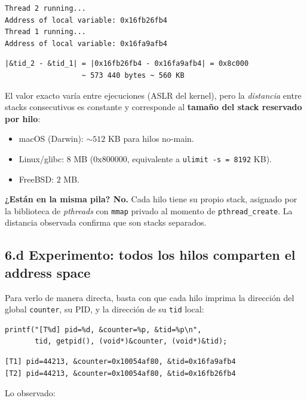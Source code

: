 \documentclass[11pt,a4paper]{article}
\begin{document}
\begin{lstlisting}[style=textstyle]
Thread 2 running...
Address of local variable: 0x16fb26fb4
Thread 1 running...
Address of local variable: 0x16fa9afb4
\end{lstlisting}

\begin{lstlisting}[style=textstyle]
|&tid_2 - &tid_1| = |0x16fb26fb4 - 0x16fa9afb4| = 0x8c000
                  ~ 573 440 bytes ~ 560 KB
\end{lstlisting}

El valor exacto varía entre ejecuciones (ASLR del kernel), pero la
\emph{distancia} entre stacks consecutivos es constante y corresponde
al \textbf{tamaño del stack reservado por hilo}:

\begin{itemize}[leftmargin=*]
    \item macOS (Darwin): $\sim 512$ KB para hilos no-main.
    \item Linux/glibc: $8$ MB ($0\text{x}800000$, equivalente a
        \texttt{ulimit -s = 8192} KB).
    \item FreeBSD: $2$ MB.
\end{itemize}

\textbf{¿Están en la misma pila? No.} Cada hilo tiene su propio stack,
asignado por la biblioteca de \emph{pthreads} con \texttt{mmap} privado
al momento de \texttt{pthread\_create}. La distancia observada confirma
que son stacks separados.

\subsection*{6.d Experimento: todos los hilos comparten el address space}

Para verlo de manera directa, basta con que cada hilo imprima la
dirección del global \texttt{counter}, su PID, y la dirección de su
\texttt{tid} local:

\begin{lstlisting}[style=cstyle]
printf("[T%d] pid=%d, &counter=%p, &tid=%p\n",
       tid, getpid(), (void*)&counter, (void*)&tid);
\end{lstlisting}

\begin{lstlisting}[style=textstyle]
[T1] pid=44213, &counter=0x10054af80, &tid=0x16fa9afb4
[T2] pid=44213, &counter=0x10054af80, &tid=0x16fb26fb4
\end{lstlisting}

Lo observado:
\end{document}
